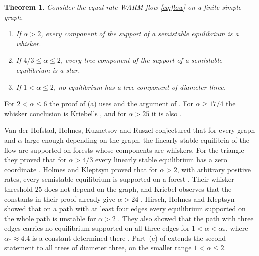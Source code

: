 \documentclass[11pt]{article}
\newtheorem{theorem}{Theorem}[section]
\theoremstyle{definition}
\theoremstyle{remark}
\begin{document}
\begin{theorem}\label{thm:det}
Consider the equal-rate WARM flow \eqref{eq:flow} on a finite simple graph.
\begin{enumerate}[label=(\alph*)]
\item If $\alpha>2$, every component of the support of a semistable equilibrium is a whisker.
\item If $4/3\le\alpha\le 2$, every tree component of the support of a semistable equilibrium is a star.
\item If $1<\alpha\le 2$, no equilibrium has a tree component of diameter three.
\end{enumerate}
\end{theorem}

For $2<\alpha\le 6$ the proof of (a) uses \cite[Theorem~3, Lemma~4]{HK} and the argument of
\cite[Proposition~9]{HHK}. For $\alpha\ge 17/4$ the whisker conclusion is Kriebel's \cite[Section~4]{Kr}, and
for $\alpha>25$ it is also \cite[Theorem~2(a)]{HK}.

Van der Hofstad, Holmes, Kuznetsov and Ruszel \cite[Conjecture~1.24]{vdHHKR} conjectured that for every graph and
$\alpha$ large enough depending on the graph, the linearly stable equilibria of the flow are supported on forests
whose components are whiskers. For the triangle they proved that for $\alpha>4/3$ every linearly stable
equilibrium has a zero coordinate \cite[Theorem~3.8]{vdHHKR}. Holmes and Kleptsyn proved that for $\alpha>2$, with
arbitrary positive rates, every semistable equilibrium is supported on a forest \cite[Theorem~3, Corollary~1]{HK}.
Their whisker threshold $25$ does not depend on the graph, and Kriebel observes that the constants in their proof
already give $\alpha>24$ \cite[Section~5]{Kr}. Hirsch, Holmes and Kleptsyn showed that on a path with at least
four edges every equilibrium supported on the whole path is unstable for $\alpha>2$ \cite[Proposition~9]{HHK}.
They also showed that the path with three edges carries no
equilibrium supported on all three edges for $1<\alpha<\alpha_*$, where $\alpha_*\approx 4.4$ is a constant
determined there \cite[Proposition~10(i)]{HHK}. Part~(c) of  extends the second statement to all
trees of diameter three, on the smaller range $1<\alpha\le 2$.
\end{document}
